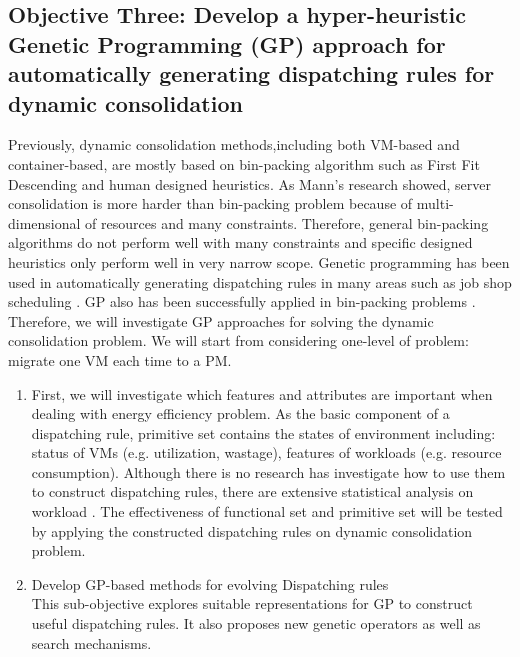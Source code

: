 \subsection{Objective Three: Develop a hyper-heuristic Genetic Programming (GP) approach for automatically generating dispatching rules for dynamic consolidation}

Previously, dynamic consolidation methods,including both VM-based and container-based, are mostly based on bin-packing algorithm such as First Fit Descending and human designed heuristics. As Mann's research \cite{Mann:2015ua} showed, server consolidation is more harder than bin-packing problem because of multi-dimensional of resources and many constraints. Therefore, general bin-packing algorithms do not perform well with many constraints and specific designed heuristics only perform well in very narrow scope. Genetic programming has been used in automatically generating dispatching rules in many areas such as job shop scheduling \cite{Nguyen:2014eu}. GP also has been successfully applied in bin-packing problems \cite{Burke:2006ei}. Therefore, we will investigate GP approaches for solving the dynamic consolidation problem. We will start from considering one-level of problem: migrate one VM each time to a PM. 


\begin{enumerate}
	\item First, we will investigate which features and attributes are important when dealing with energy efficiency problem. As the basic component of a dispatching rule, primitive set contains the states of environment including: status of VMs (e.g. utilization, wastage), features of workloads (e.g. resource consumption). Although there is no research has investigate how to use them to construct dispatching rules, there are extensive statistical analysis on workload \cite{Verma:2009wi}. The effectiveness of functional set and primitive set will be tested by applying the constructed dispatching rules on dynamic consolidation problem.

	\item Develop GP-based methods for evolving Dispatching rules \\
		This sub-objective explores suitable representations for GP to construct useful dispatching rules. It also proposes new genetic operators as well as search mechanisms.
	\end{enumerate}

